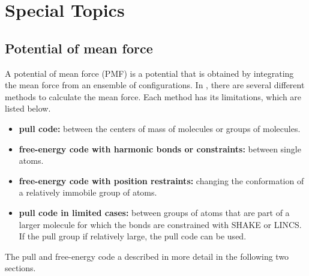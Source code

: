 %
% 
% 
% 
% 
% 
% 
% 
% 
%

\chapter{Special Topics}
\label{ch:special}

\section{Potential of mean force}

A potential of mean force (PMF) is a potential that is obtained
by integrating the mean force from an ensemble of configurations.
In {\gromacs}, there are several different methods to calculate the mean force.
Each method has its limitations, which are listed below.
\begin{itemize}
\item{\bf pull code:} between the centers of mass of molecules or groups of molecules.
\item{\bf free-energy code with harmonic bonds or constraints:} between single atoms. 
\item{\bf free-energy code with position restraints:} changing the conformation of a relatively immobile group of atoms.
\item{\bf pull code in limited cases:} between groups of atoms that are
part of a larger molecule for which the bonds are constrained with
SHAKE or LINCS. If the pull group if relatively large,
the pull code can be used.
\end{itemize}
The pull and free-energy code a described in more detail
in the following two sections.

